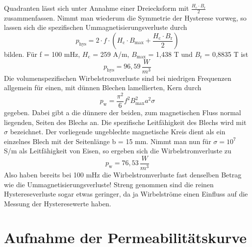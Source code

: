 \documentclass[a4paper,twoside,12pt,DIV=13,BCOR=5mm,numbers=noenddot,cleardoublepage=empty]{scrbook}
\begin{document}
        Quadranten l\"asst sich unter Annahme einer Dreiecksform mit $\frac{H_\mathrm{c}\cdot B_\mathrm{r}}{2}$ 
        zusammenfassen. Nimmt man wiederum die Symmetrie der Hysterese vorweg, so 
        lassen sich die spezifischen Ummagnetisierungsverluste durch
        \begin{equation}
            p_\mathrm{hys} = 2 \cdot f \cdot (H_\mathrm{c} \cdot B_\mathrm{max} + \frac{H_\mathrm{c}\cdot B_\mathrm{r}}{2})
        \end{equation}
        bilden. F\"ur f = 100 mHz, $H_\mathrm{c}$ = 259 A/m, $B_\mathrm{max}$ = 1,438 T und $B_\mathrm{r}$ = 0,8835 T ist
        \begin{equation}
            p_\mathrm{hys} = 96,59 \,\frac{W}{m^3}
        \end{equation}
        Die volumenspezifischen Wirbelstromverluste sind bei niedrigen Frequenzen allgemein f\"ur einen, mit d\"unnen Blechen lamellierten, Kern durch
        \begin{equation}
            p_\mathrm{w} = \frac{\pi^2}{6}f^2B_\mathrm{max}^2a^2 \sigma
        \end{equation}
        gegeben. Dabei gibt a die d\"unnere der beiden, zum magnetischen Fluss normal liegenden, Seiten des Blechs an. Die spezifische Leitf\"ahigkeit des Blechs wird mit $\sigma$ bezeichnet. Der vorliegende ungeblechte magnetische Kreis dient als ein einzelnes Blech mit der Seitenl\"ange b = 15 mm. Nimmt man nun f\"ur $\sigma = 10^7$ S/m als Leitf\"ahigkeit von Eisen, so ergeben sich die Wirbelstromverluste zu
        \begin{equation}
            p_\mathrm{w} = 76,53\,\frac{W}{m^3}
        \end{equation}
        Also haben bereits bei 100 mHz die Wirbelstromverluste fast denselben Betrag wie die Ummagnetisierungsverluste! Streng genommen sind die reinen Hystereseverluste sogar etwas geringer, da ja Wirbelstr\"ome einen Einfluss auf die Messung der Hysteresewerte haben.
    \section{Aufnahme der Permeabilit\"atskurve}
\end{document}
